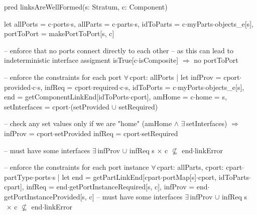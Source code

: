 pred linksAreWellFormed(s: Stratum, c: Component)
{
  let
    allPorts = c$\cdot$ports$\cdot$s,
    allParts = c$\cdot$parts$\cdot$s,
    idToParts = c$\cdot$myParts$\cdot$objects_e[s],
    portToPort =   makePortToPort[s, c]
  {
    -- enforce that no ports connect directly to each other
    -- as this can lead to indeterministic interface assigment
    isTrue[c$\cdot$isComposite] $\Longrightarrow$
      no portToPort

    -- enforce the constraints for each port
    $\forall\,$cport: allPorts |
    let
      infProv = cport$\cdot$provided$\cdot$c$\cdot$s,
      infReq = cport$\cdot$required$\cdot$c$\cdot$s,
      idToPorts = c$\cdot$myPorts$\cdot$objects_e[s],
      end = getComponentLinkEnd[idToPorts$\cdot$cport],
      amHome = c$\cdot$home = s,
      setInterfaces = cport$\cdot$(setProvided $\cup$ setRequired)
    {
      -- check any set values only if we are "home"
      (amHome $\wedge$ $\exists\,$setInterfaces) $\Longrightarrow$
      {
        infProv = cport$\cdot$setProvided
        infReq = cport$\cdot$setRequired
      }
      
      -- must have some interfaces
      $\exists\,$infProv $\cup$ infReq
      s$\,\times\,$c $\not\subseteq$ end$\cdot$linkError
    }

    -- enforce the constraints for each port instance
    $\forall\,$cpart: allParts,
      cport: cpart$\cdot$partType$\cdot$ports$\cdot$s |
    let
      end = getPartLinkEnd[cpart$\cdot$portMap[s]$\cdot$cport, idToParts$\cdot$cpart],
      infReq = end$\cdot$getPortInstanceRequired[s, c],
      infProv = end$\cdot$getPortInstanceProvided[s, c]
    {
      -- must have some interfaces
      $\exists\,$infProv $\cup$ infReq
      s$\,\times\,$c $\not\subseteq$ end$\cdot$linkError
    }
  }
}


